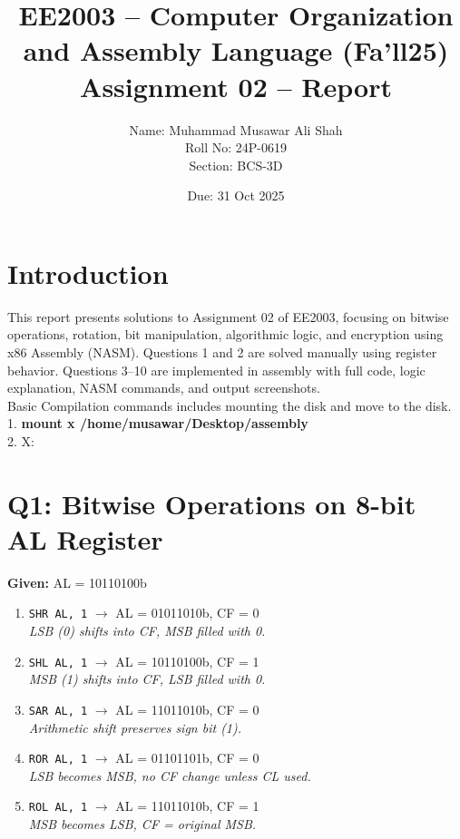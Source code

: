 \documentclass[12pt,a4paper]{article}
\title{\textbf{EE2003 – Computer Organization and Assembly Language (Fa’ll25)}\\
Assignment 02 – Report}
\author{
    Name: Muhammad Musawar Ali Shah \\
    Roll No: 24P-0619 \\
    Section: BCS-3D
}
\date{Due: 31 Oct 2025}
\begin{document}
\maketitle
\thispagestyle{empty}

\section*{Introduction}
This report presents solutions to Assignment 02 of EE2003, focusing on bitwise operations, rotation, bit manipulation, algorithmic logic, and encryption using x86 Assembly (NASM). Questions 1 and 2 are solved manually using register behavior. Questions 3--10 are implemented in assembly with full code, logic explanation, NASM commands, and output screenshots. \\
Basic Compilation commands includes mounting the disk and move to the disk. \\
1. \textbf{mount x /home/musawar/Desktop/assembly} \\
2. X:

\newpage

\section{Q1: Bitwise Operations on 8-bit AL Register}
\textbf{Given:} AL = 10110100b

\begin{enumerate}[label=\alph*.]
    \item \texttt{SHR AL, 1} $\rightarrow$ AL = 01011010b, CF = 0 \\
          \textit{LSB (0) shifts into CF, MSB filled with 0.}
    \item \texttt{SHL AL, 1} $\rightarrow$ AL = 10110100b, CF = 1 \\
          \textit{MSB (1) shifts into CF, LSB filled with 0.}
    \item \texttt{SAR AL, 1} $\rightarrow$ AL = 11011010b, CF = 0 \\
          \textit{Arithmetic shift preserves sign bit (1).}
    \item \texttt{ROR AL, 1} $\rightarrow$ AL = 01101101b, CF = 0 \\
          \textit{LSB becomes MSB, no CF change unless CL used.}
    \item \texttt{ROL AL, 1} $\rightarrow$ AL = 11011010b, CF = 1 \\
          \textit{MSB becomes LSB, CF = original MSB.}
\end{enumerate}
\end{document}
